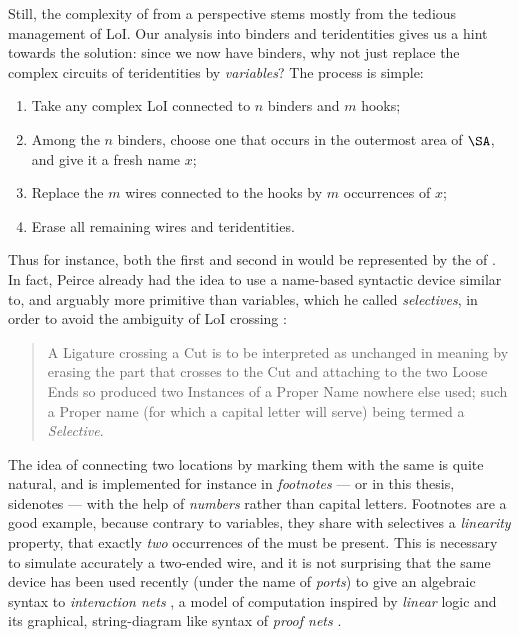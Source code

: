 \begin{scope}
Still, the complexity of  from a  perspective stems mostly from the
tedious management of LoI. Our analysis into binders and teridentities gives us
a hint towards the solution: since we now have binders, why not just replace
the complex circuits of teridentities by \emph{variables}? The process is
simple:
\begin{enumerate}
  \item Take any complex LoI connected to $n$ binders and $m$ hooks;
  \item Among the $n$ binders, choose one that occurs in the outermost area of
  $\SA$, and give it a fresh name $x$;
  \item Replace the $m$ wires connected to the hooks by $m$ occurrences of $x$;
  \item Erase all remaining wires and teridentities.
\end{enumerate}
Thus for instance, both the first and second  in
 would be represented by the  of
. In fact, Peirce already had the idea to use a
name-based syntactic device similar to, and arguably more primitive than
variables, which he called \emph{selectives}, in order to avoid the ambiguity of
LoI crossing  \cite[p.~531]{peirce_prolegomena_1906}:
\begin{quote}
A Ligature crossing a Cut is to be interpreted as unchanged in meaning by
erasing the part that crosses to the Cut and attaching to the two Loose Ends so
produced two Instances of a Proper Name nowhere else used; such a Proper name
(for which a capital letter will serve) being termed a \emph{Selective}.
\end{quote}
The idea of connecting two locations by marking them with the same  is
quite natural, and is implemented for instance in \emph{footnotes} --- or in
this thesis, sidenotes --- with the help of \emph{numbers} rather than capital
letters. Footnotes are a good example, because contrary to variables, they share
with selectives a \emph{linearity} property, that exactly \emph{two} occurrences
of the  must be present. This is necessary to simulate accurately a
two-ended wire, and it is not surprising that the same device has been used
recently (under the name of \emph{ports}) to give an algebraic syntax to
\emph{interaction nets} , a model of
computation inspired by \emph{linear} logic and its graphical, string-diagram
like syntax of \emph{proof nets} \cite{girard-linear-1987}.


\end{scope}
